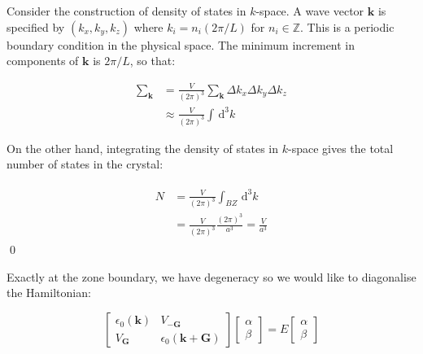 \documentclass[12pt]{article}
\begin{document}



\pagebreak
\section*{}




Consider the construction of density of states in $k$-space. A wave vector $\mathbf{k}$ is specified by $(k_{x}, k_{y}, k_{z})$ where $k_{i} = n_{i}(2\pi/L)$ for $n_{i} \in \mathbb{Z}$. This is a periodic boundary condition in the physical space. The minimum increment in components of $\mathbf{k}$ is $2\pi/L$, so that:


\begin{equation}
    \begin{split}
        \sum_{\mathbf{k}} &= \frac{V}{(2\pi)^{3}} \sum_{\mathbf{k}} \Delta k_{x} \Delta k_{y} \Delta k_{z} \\
        &\approx \frac{V}{(2\pi)^{3}} \int \, \mathrm{d}^{3}k
    \end{split}
\end{equation}


On the other hand, integrating the density of states in $k$-space gives the total number of states in the crystal:


\begin{equation}
    \begin{split}
        \begin{split}
            N &= \frac{V}{(2\pi)^{3}} \int_{BZ} \, \mathrm{d}^{3}k \\
            &= \frac{V}{(2\pi)^{3}} \frac{(2\pi)^{3}}{a^{3}} = \frac{V}{a^{3}}
        \end{split}
    \end{split}
\end{equation}
\qed




Exactly at the zone boundary, we have degeneracy so we would like to diagonalise the Hamiltonian:

\begin{equation}
    \begin{bmatrix}
        \epsilon_{0}(\mathbf{k}) & V_{-\mathbf{G}}                       \\
        V_{\mathbf{G}}           & \epsilon_{0}(\mathbf{k} + \mathbf{G})
    \end{bmatrix}
    \begin{bmatrix}
        \alpha \\
        \beta
    \end{bmatrix}
    =
    E
    \begin{bmatrix}
        \alpha \\
        \beta
    \end{bmatrix}
\end{equation}
\end{document}
